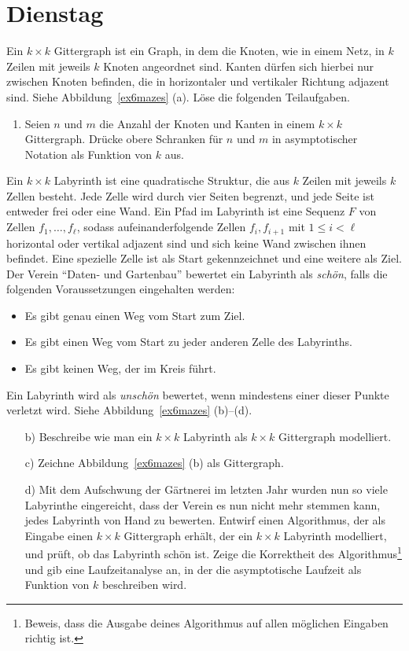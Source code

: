 \documentclass{uebung_cs}
\begin{document}
\section*{Dienstag}

\begin{aufgabe}
	Ein $k\times k$ Gittergraph ist ein Graph, in dem die Knoten, wie in einem Netz, in $k$ Zeilen mit jeweils $k$ Knoten angeordnet sind.
	Kanten dürfen sich hierbei nur zwischen Knoten befinden, die in horizontaler und vertikaler Richtung adjazent sind.
	Siehe Abbildung~\ref{ex6mazes} (a).
	Löse die folgenden Teilaufgaben.
	\begin{enumerate}
		\item Seien $n$ und $m$ die Anzahl der Knoten und Kanten in einem $k\times k$ Gittergraph.
		Drücke obere Schranken für $n$ und $m$ in asymptotischer Notation als Funktion von $k$ aus.
	\end{enumerate}
	Ein $k\times k$ Labyrinth ist eine quadratische Struktur, die aus $k$ Zeilen mit jeweils $k$ Zellen besteht.
	Jede Zelle wird durch vier Seiten begrenzt, und jede Seite ist entweder frei oder eine Wand.
	Ein Pfad im Labyrinth ist eine Sequenz $F$ von Zellen $f_1,\ldots, f_\ell$, sodass aufeinanderfolgende Zellen $f_i, f_{i+1}$ mit $1 \leq i < \ell$ horizontal oder vertikal adjazent sind und sich keine Wand zwischen ihnen befindet.
	Eine spezielle Zelle ist als Start gekennzeichnet und eine weitere als Ziel.\\
	Der Verein \enquote{Daten- und Gartenbau} bewertet ein Labyrinth als \textit{schön}, falls die folgenden Voraussetzungen eingehalten werden:
	\begin{itemize}
		\item Es gibt genau einen Weg vom Start zum Ziel.
		\item Es gibt einen Weg vom Start zu jeder anderen Zelle des Labyrinths.
		\item Es gibt keinen Weg, der im Kreis führt.
	\end{itemize}
	Ein Labyrinth wird als \textit{unschön} bewertet, wenn mindestens einer dieser Punkte verletzt wird.
	Siehe Abbildung~\ref{ex6mazes} (b)--(d).
	\begin{enumerate}
		\item[b)] Beschreibe wie man ein $k\times k$ Labyrinth als $k\times k$ Gittergraph modelliert.
		\item[c)] Zeichne Abbildung~\ref{ex6mazes} (b) als Gittergraph.
		\item[d)] Mit dem Aufschwung der Gärtnerei im letzten Jahr wurden nun so viele Labyrinthe eingereicht, dass der Verein es nun nicht mehr stemmen kann, jedes Labyrinth von Hand zu bewerten.
		Entwirf einen Algorithmus, der als Eingabe einen $k\times k$ Gittergraph erhält, der ein $k\times k$ Labyrinth modelliert, und prüft, ob das Labyrinth schön ist.
		Zeige die Korrektheit des Algorithmus\footnote{Beweis, dass die Ausgabe deines Algorithmus auf allen möglichen Eingaben richtig ist.} und gib eine Laufzeitanalyse an, in der die asymptotische Laufzeit als Funktion von $k$ beschreiben wird.
	\end{enumerate}
\end{aufgabe}
\end{document}
